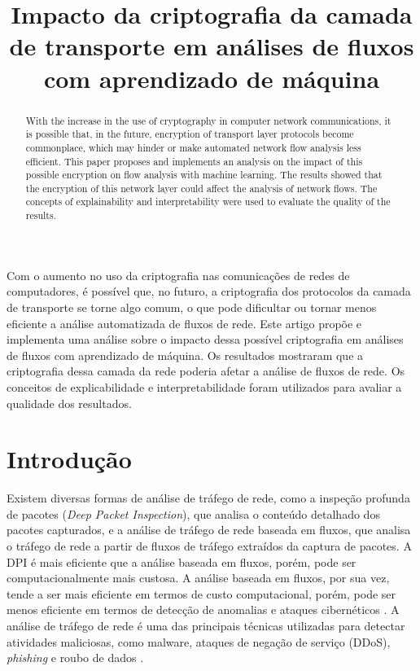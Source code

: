 \documentclass[12pt]{article}
\title{Impacto da criptografia da camada de transporte em análises de fluxos com aprendizado de máquina}
\author{
}
\begin{document}
\maketitle

\begin{resumo}
    Com o aumento no uso da criptografia nas comunicações de redes de computadores, é possível que, no futuro, a criptografia dos protocolos da camada de transporte se torne algo comum, o que pode dificultar ou tornar menos eficiente a análise automatizada de fluxos de rede. Este artigo propõe e implementa uma análise sobre o impacto dessa possível criptografia em análises de fluxos com aprendizado de máquina. Os resultados mostraram que a criptografia dessa camada da rede poderia afetar a análise de fluxos de rede. Os conceitos de explicabilidade e interpretabilidade foram utilizados para avaliar a qualidade dos resultados.
\end{resumo}

\begin{abstract}
    With the increase in the use of cryptography in computer network communications, it is possible that, in the future, encryption of transport layer protocols become commonplace, which may hinder or make automated network flow analysis less efficient. This paper proposes and implements an analysis on the impact of this possible encryption on flow analysis with machine learning. The results showed that the encryption of this network layer could affect the analysis of network flows. The concepts of explainability and interpretability were used to evaluate the quality of the results.
\end{abstract}

\section{Introdução}
\label{cap:introducao}

Existem diversas formas de análise de tráfego de rede, como a inspeção profunda de pacotes (\emph{Deep Packet Inspection}), que analisa o conteúdo detalhado dos pacotes capturados, e a análise de tráfego de rede baseada em fluxos, que analisa o tráfego de rede a partir de fluxos de tráfego extraídos da captura de pacotes. A DPI é mais eficiente que a análise baseada em fluxos, porém, pode ser computacionalmente mais custosa. A análise baseada em fluxos, por sua vez, tende a ser mais eficiente em termos de custo computacional, porém, pode ser menos eficiente em termos de detecção de anomalias e ataques cibernéticos \cite{boukhtouta2016network}.
A análise de tráfego de rede é uma das principais técnicas utilizadas para detectar atividades maliciosas, como malware, ataques de negação de serviço (DDoS), \emph{phishing} e roubo de dados \cite{joshi2015review}.
\end{document}
